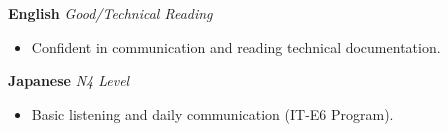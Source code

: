 

\divider


\textbf{English} \hfill \textit{Good/Technical Reading}
\begin{itemize}
    \item Confident in communication and reading technical documentation.
\end{itemize}

\divider

\textbf{Japanese} \hfill \textit{N4 Level}
\begin{itemize}
    \item Basic listening and daily communication (IT-E6 Program).
\end{itemize}

\divider


\divider

